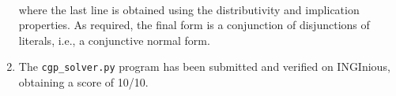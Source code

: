\documentclass[journal,onecolumn]{IEEEtran}
\newcommand{\py}[1]{\texttt{#1}}
\begin{document}
\begin{enumerate}
\begin{align*}
	\end{align*}
	where the last line is obtained using the distributivity and implication properties.
	As required, the final form is a conjunction of disjunctions of literals, i.e., a conjunctive normal form.
	\item The \py{cgp_solver.py} program has been submitted and verified on INGInious, obtaining a score of 10/10.
\end{enumerate}
\end{document}
